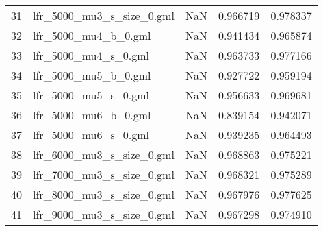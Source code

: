 \begin{tabular}{llrrr}
31 &   lfr\_5000\_mu3\_s\_size\_0.gml &                 NaN &                      0.966719 &                    0.978337 \\
32 &        lfr\_5000\_mu4\_b\_0.gml &                 NaN &                      0.941434 &                    0.965874 \\
33 &        lfr\_5000\_mu4\_s\_0.gml &                 NaN &                      0.963733 &                    0.977166 \\
34 &        lfr\_5000\_mu5\_b\_0.gml &                 NaN &                      0.927722 &                    0.959194 \\
35 &        lfr\_5000\_mu5\_s\_0.gml &                 NaN &                      0.956633 &                    0.969681 \\
36 &        lfr\_5000\_mu6\_b\_0.gml &                 NaN &                      0.839154 &                    0.942071 \\
37 &        lfr\_5000\_mu6\_s\_0.gml &                 NaN &                      0.939235 &                    0.964493 \\
38 &   lfr\_6000\_mu3\_s\_size\_0.gml &                 NaN &                      0.968863 &                    0.975221 \\
39 &   lfr\_7000\_mu3\_s\_size\_0.gml &                 NaN &                      0.968321 &                    0.975289 \\
40 &   lfr\_8000\_mu3\_s\_size\_0.gml &                 NaN &                      0.967976 &                    0.977625 \\
41 &   lfr\_9000\_mu3\_s\_size\_0.gml &                 NaN &                      0.967298 &                    0.974910 \\
\bottomrule
\end{tabular}
